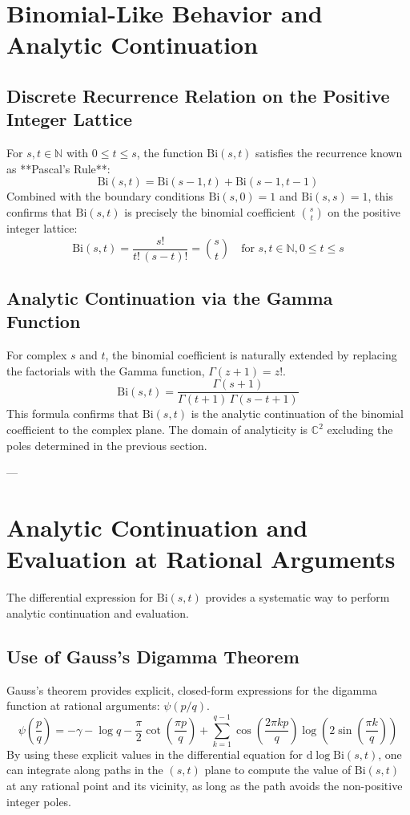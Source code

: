 \documentclass{article}
\newcommand{\Bi}{\mathrm{Bi}}
\newcommand{\diff}{\mathrm{d}}
\newcommand{\eulergam}{\gamma} %
\begin{document}
\section{Binomial-Like Behavior and Analytic Continuation}
\label{sec:gamma_connection}

\subsection{Discrete Recurrence Relation on the Positive Integer Lattice}
For $s, t \in \mathbb{N}$ with $0 \leq t \leq s$, the function $\Bi(s,t)$ satisfies the recurrence known as **Pascal's Rule**:
\begin{equation}
\Bi(s,t) = \Bi(s-1,t) + \Bi(s-1,t-1)
\end{equation}
Combined with the boundary conditions $\Bi(s,0) = 1$ and $\Bi(s,s) = 1$, this confirms that $\Bi(s,t)$ is precisely the binomial coefficient $\binom{s}{t}$ on the positive integer lattice:
\begin{equation}
\Bi(s,t) = \frac{s!}{t!\,(s-t)!} = \binom{s}{t} \quad \text{for } s, t \in \mathbb{N}, 0 \leq t \leq s
\end{equation}

\subsection{Analytic Continuation via the Gamma Function}
For complex $s$ and $t$, the binomial coefficient is naturally extended by replacing the factorials with the Gamma function, $\Gamma(z+1) = z!$.
\begin{equation}
\Bi(s,t) = \frac{\Gamma(s+1)}{\Gamma(t+1)\,\Gamma(s-t+1)}
\end{equation}
This formula confirms that $\Bi(s,t)$ is the analytic continuation of the binomial coefficient to the complex plane. The domain of analyticity is $\mathbb{C}^2$ excluding the poles determined in the previous section.

---

\section{Analytic Continuation and Evaluation at Rational Arguments}

The differential expression for $\Bi(s,t)$ provides a systematic way to perform analytic continuation and evaluation.

\subsection{Use of Gauss's Digamma Theorem}
Gauss's theorem provides explicit, closed-form expressions for the digamma function at rational arguments: $\psi(p/q)$.
$$
\psi\left(\frac{p}{q}\right) = -\eulergam - \log q - \frac{\pi}{2} \cot\left(\frac{\pi p}{q}\right) + \sum_{k=1}^{q-1} \cos\left(\frac{2\pi k p}{q}\right) \log\left(2 \sin\left(\frac{\pi k}{q}\right)\right)
$$
By using these explicit values in the differential equation for $\diff \log \Bi(s,t)$, one can integrate along paths in the $(s,t)$ plane to compute the value of $\Bi(s,t)$ at any rational point and its vicinity, as long as the path avoids the non-positive integer poles.
\end{document}
